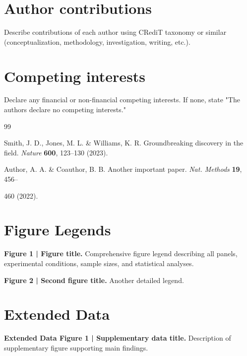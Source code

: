 \documentclass[12pt]{article}
\begin{document}
\section*{Author contributions}
Describe contributions of each author using CRediT taxonomy or similar (conceptualization, methodology, investigation, writing, etc.).

\section*{Competing interests}
Declare any financial or non-financial competing interests. If none, state "The authors declare no competing interests."


\begin{thebibliography}{99}

Smith, J. D., Jones, M. L. \& Williams, K. R. Groundbreaking discovery in the field. \textit{Nature} \textbf{600}, 123--130 (2023).

Author, A. A. \& Coauthor, B. B. Another important paper. \textit{Nat. Methods} \textbf{19}, 456--

460 (2022).


\end{thebibliography}

\section*{Figure Legends}

\textbf{Figure 1 | Figure title.} Comprehensive figure legend describing all panels, experimental conditions, sample sizes, and statistical analyses.

\textbf{Figure 2 | Second figure title.} Another detailed legend.

\section*{Extended Data}

\textbf{Extended Data Figure 1 | Supplementary data title.} Description of supplementary figure supporting main findings.
\end{document}
